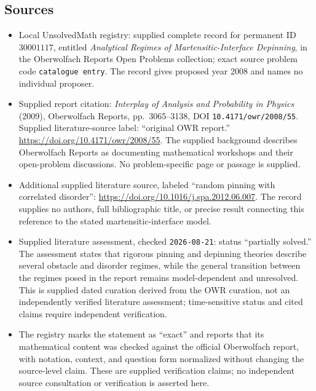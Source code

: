 \documentclass[11pt]{article}
\begin{document}
\subsection{Sources}
\begin{itemize}
\item Local UnsolvedMath registry: supplied complete record for permanent ID \(30001117\), entitled \emph{Analytical Regimes of Martensitic-Interface Depinning}, in the Oberwolfach Reports Open Problems collection; exact source problem code \texttt{catalogue entry}. The record gives proposed year 2008 and names no individual proposer.
\item Supplied report citation: \emph{Interplay of Analysis and Probability in Physics} (2009), Oberwolfach Reports, pp.\ 3065--3138, DOI \texttt{10.4171/owr/2008/55}. Supplied literature-source label: ``original OWR report.'' \url{https://doi.org/10.4171/owr/2008/55}. The supplied background describes Oberwolfach Reports as documenting mathematical workshops and their open-problem discussions. No problem-specific page or passage is supplied.
\item Additional supplied literature source, labeled ``random pinning with correlated disorder'': \url{https://doi.org/10.1016/j.spa.2012.06.007}. The record supplies no authors, full bibliographic title, or precise result connecting this reference to the stated martensitic-interface model.
\item Supplied literature assessment, checked \texttt{2026-08-21}: status ``partially solved.'' The assessment states that rigorous pinning and depinning theories describe several obstacle and disorder regimes, while the general transition between the regimes posed in the report remains model-dependent and unresolved. This is supplied dated curation derived from the OWR curation, not an independently verified literature assessment; time-sensitive status and cited claims require independent verification.
\item The registry marks the statement as ``exact'' and reports that its mathematical content was checked against the official Oberwolfach report, with notation, context, and question form normalized without changing the source-level claim. These are supplied verification claims; no independent source consultation or verification is asserted here.
\end{itemize}
\end{document}
